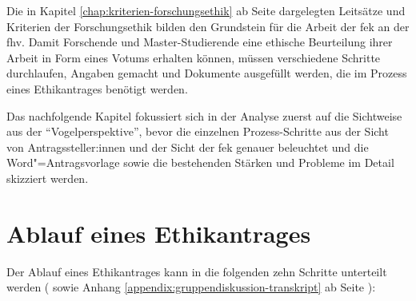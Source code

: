\documentclass[a4paper,12pt,twoside]{scrreprt}
\begin{document}
Die in Kapitel \ref{chap:kriterien-forschungsethik} ab Seite \pageref{chap:kriterien-forschungsethik} dargelegten Leitsätze und Kriterien der Forschungsethik bilden den Grundstein für die Arbeit der \acl{fek} an der \acl{fhv}. Damit Forschende und Master-Studierende eine ethische Beurteilung ihrer Arbeit in Form eines Votums erhalten können, müssen verschiedene Schritte durchlaufen, Angaben gemacht und Dokumente ausgefüllt werden, die im Prozess eines Ethikantrages benötigt werden.

\medskip

Das nachfolgende Kapitel fokussiert sich in der Analyse zuerst auf die Sichtweise aus der \enquote{Vogelperspektive}, bevor die einzelnen Prozess-Schritte aus der Sicht von Antragssteller:innen und der Sicht der \ac{fek} genauer beleuchtet und die Word"=Antragsvorlage sowie die bestehenden Stärken und Probleme im Detail skizziert werden.

\section{Ablauf eines Ethikantrages}
\label{sec:ablauf-ethikantrag}

Der Ablauf eines Ethikantrages kann in die folgenden zehn Schritte unterteilt werden (\cite{fachhochschule_vorarlberg_gmbh_forschungsethik-kommission_2021, forschungsethik-kommission_der_fachhochschule_vorarlberg_verfahrensordnung_2020} sowie Anhang \ref{appendix:gruppendiskussion-transkript} ab Seite \pageref{appendix:gruppendiskussion-transkript}):
\end{document}
